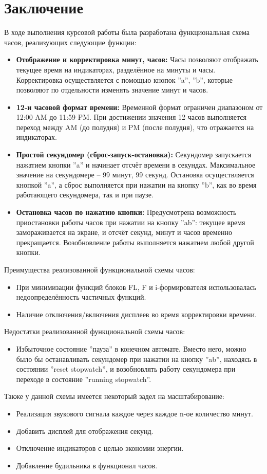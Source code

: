 \documentclass[11pt,a4paper,final]{article} %
\begin{document}
\section*{Заключение}
В ходе выполнения курсовой работы была разработана функциональная схема часов, реализующих следующие функции:
\begin{itemize}
	\item \textbf{Отображение и корректировка минут, часов:} Часы позволяют отображать текущее время на индикаторах, разделённое на минуты и часы. Корректировка осуществляется с помощью кнопок ''a'', ''b'', которые позволяют по отдельности изменять значение минут и часов.
	\item \textbf{12-и часовой формат времени:} Временной формат ограничен диапазоном от 12:00 AM до 11:59 PM. При достижении значения 12 часов выполняется переход между AM (до полудня) и PM (после полудня), что отражается на индикаторах.
	\item \textbf{Простой секундомер (сброс-запуск-остановка):} Секундомер запускается нажатием кнопки ''a'' и начинает отсчёт времени в секундах. Максимальное значение на секундомере -- 99 минут, 99 секунд. Остановка осуществляется кнопкой ''a'', а сброс выполняется при нажатии на кнопку ''b'', как во время работающего секундомера, так и при паузе.
	\item \textbf{Остановка часов по нажатию кнопки:} Предусмотрена возможность приостановки работы часов при нажатии на кнопку ''ab'': текущее время замораживается на экране, и отсчёт секунд, минут и часов временно прекращается. Возобновление работы выполняется нажатием любой другой кнопки.
\end{itemize}
Преимущества реализованной функциональной схемы часов:
\begin{itemize}
	\item При минимизации функций блоков FL, F и i-формирователя использовалась недоопределённость частичных функций.
	\item Наличие отключения/включения дисплеев во время корректировки времени.
\end{itemize}
Недостатки реализованной функциональной схемы часов:
\begin{itemize}
	\item Избыточное состояние ''пауза'' в конечном автомате. Вместо него, можно было бы останавливать секундомер при нажатии на кнопку ''ab'', находясь в состоянии ''reset stopwatch'', и возобновлять работу секундомера при переходе в состояние ''running stopwatch''. 
\end{itemize}
Также у данной схемы имеется некоторый задел на масштабирование:
\begin{itemize}
	\item Реализация звукового сигнала каждое через каждое n-ое количество минут.
	\item Добавить дисплей для отображения секунд.
	\item Отключение индикаторов с целью экономии энергии.
	\item Добавление будильника в функционал часов.
\end{itemize}
\end{document}
